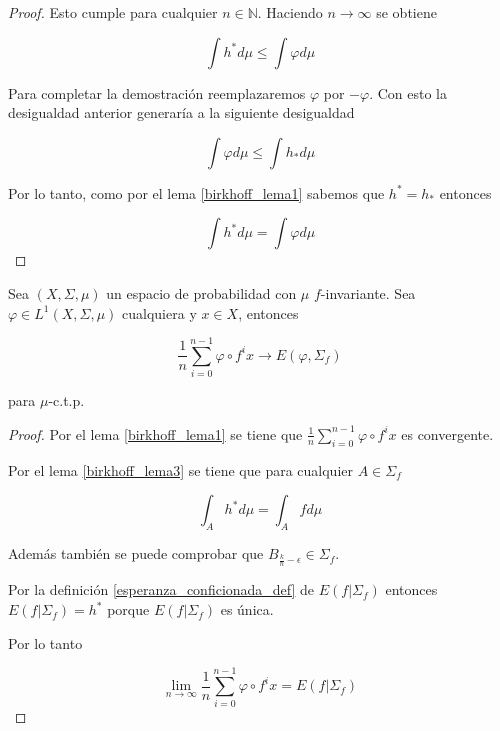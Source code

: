 \begin{proof}
	Esto cumple para cualquier $n \in \mathbb{N}$. Haciendo $n \rightarrow \infty$ se obtiene
	
	\begin{equation}
		\int h^* d\mu \leq \int \varphi d\mu
	\end{equation}
	
	Para completar la demostración reemplazaremos $\varphi$ por $-\varphi$. Con esto la desigualdad anterior generaría a la siguiente desigualdad
	
	\begin{equation}
		\int \varphi d\mu \leq \int h_* d\mu
	\end{equation}
	
	Por lo tanto, como por el lema \ref{birkhoff_lema1} sabemos que $h^*=h_*$ entonces
	
	\begin{equation}
		\int h^* d\mu = \int \varphi d\mu
	\end{equation}
\end{proof}

\begin{teorema}\label{birkhoff_thm}
	Sea $(X,\Sigma,\mu)$ un espacio de probabilidad  con $\mu$ $f$-invariante. Sea $\varphi \in L^1(X,\Sigma,\mu)$ cualquiera y $x \in X$, entonces
	
	\begin{equation}\label{birkhoff_thm_eq1}
		\frac{1}{n} \sum_{i=0}^{n-1} \varphi \circ f^i x \rightarrow E(\varphi,\Sigma_f)
	\end{equation}
	
	para $\mu$-c.t.p.
	
\end{teorema}

\begin{proof}
	Por el lema \ref{birkhoff_lema1} se tiene que $\frac{1}{n} \sum_{i=0}^{n-1} \varphi \circ f^i x$ es convergente.
	
	Por el lema \ref{birkhoff_lema3} se tiene que para cualquier $A \in \Sigma_f$
	
	\begin{equation}
		\int _A h^* d\mu = \int_A f d\mu
	\end{equation}
	
	Además también se puede comprobar que $B_{\frac{k}{n}-\epsilon} \in \Sigma_f$.
	
	Por la definición \ref{esperanza_conficionada_def} de $E(f|\Sigma_f)$ entonces $E(f|\Sigma_f)=h^*$ porque $E(f|\Sigma_f)$ es única.
	
	Por lo tanto
	
	\begin{equation}
		\lim_{n \rightarrow \infty} \frac{1}{n} \sum_{i=0}^{n-1} \varphi \circ f^i x = E(f|\Sigma_f)
	\end{equation}
\end{proof}

